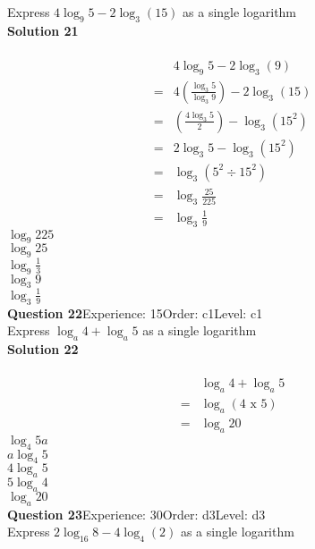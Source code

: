 \documentclass{article}
\begin{document}
Express $4\log_{9}5-2\log_{3}(15)$ as a single logarithm\\[4pt]
\noindent\textbf{Solution 21}\\[2pt]
\\[-10pt]\begin{align*}
&4\log_{9}5-2\log_{3}(9)\\[2pt]
=&4\left(\displaystyle\frac{\log_{3}5}{\log_{3}9}\right)-2\log_{3}(15)\\[2pt]
=&\left(\displaystyle\frac{4\log_{3}5}{2}\right)-\log_{3}(15^2)\\[2pt]
=&2\log_{3}5-\log_{3}(15^2)\\[2pt]
=&\log_{3}(5^2 \div 15^2)\\[2pt]
=&\log_{3}\displaystyle\frac{25}{225}\\[2pt]
=&\log_{3}\displaystyle\frac{1}{9}
\end{align*}
$\log_{9}225$\\
$\log_{9}25$\\
$\log_{9}\displaystyle\frac{1}{3}$\\
$\log_{3}9$\\
$\log_{3}\displaystyle\frac{1}{9}$\\
\noindent\textbf{Question 22}\hspace{20pt}Experience: 15\hspace{20pt}Order: c1\hspace{20pt}Level: c1\\[2pt]
Express $\log_{a}4+\log_{a}5$ as a single logarithm\\[4pt]
\noindent\textbf{Solution 22}\\[2pt]
\\[-10pt]\begin{align*}
&\log_{a}4+\log_{a}5\\[2pt]
=&\log_{a}(4 \,\, \text{x} \,\, 5)\\[2pt]
=&\log_{a}20
\end{align*}
$\log_{4}5a$\\
$a\log_{4}5$\\
$4\log_{a}5$\\
$5\log_{a}4$\\
$\log_{a}20$\\
\noindent\textbf{Question 23}\hspace{20pt}Experience: 30\hspace{20pt}Order: d3\hspace{20pt}Level: d3\\[2pt]
Express $2\log_{16}8-4\log_{4}(2)$ as a single logarithm\\[4pt]
\end{document}

